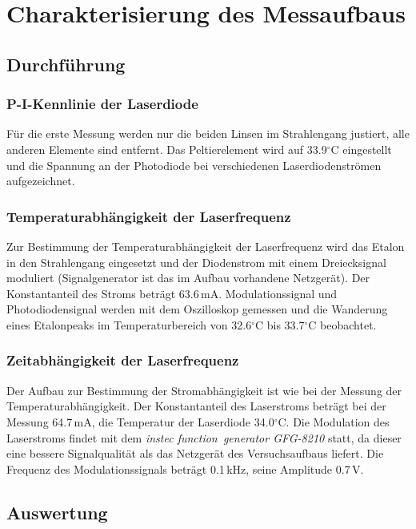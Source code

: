 \section{Charakterisierung des Messaufbaus}
\subsection{Durchführung}
\label{sect:durchführung}
\subsubsection*{P-I-Kennlinie der Laserdiode}
Für die erste Messung werden nur die beiden Linsen im Strahlengang justiert, alle anderen Elemente sind entfernt. 
Das Peltierelement wird auf 33.9$^\circ$C eingestellt und die Spannung an der
Photodiode bei verschiedenen Laserdiodenströmen aufgezeichnet.

\subsubsection*{Temperaturabhängigkeit der Laserfrequenz}
Zur Bestimmung der Temperaturabhängigkeit der
Laserfrequenz wird das Etalon in den Strahlengang eingesetzt und der Diodenstrom mit einem Dreiecksignal moduliert
(Signalgenerator ist das im Aufbau vorhandene Netzgerät).
Der Konstantanteil des Stroms beträgt 63.6\,mA.
Modulationssignal und Photodiodensignal werden mit dem Oszilloskop gemessen und die Wanderung eines Etalonpeaks
im Temperaturbereich von 32.6$^\circ$C bis 33.7$^\circ$C beobachtet.

\subsubsection*{Zeitabhängigkeit der Laserfrequenz}
Der Aufbau zur Bestimmung der Stromabhängigkeit ist
wie bei der Messung der Temperaturabhängigkeit.
Der Konstantanteil des Laserstroms beträgt bei der Messung 64.7\,mA,
die Temperatur der Laserdiode 34.0$^\circ$C.
Die Modulation des Laserstroms findet mit dem \emph{instec function~generator GFG-8210} statt,
da dieser eine bessere Signalqualität als das Netzgerät des Versuchsaufbaus liefert.
Die Frequenz des Modulationssignals beträgt 0.1\,kHz, seine Amplitude 0.7\,V.

\subsection{Auswertung}
